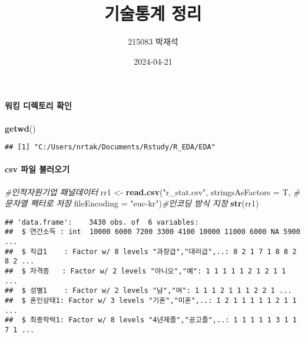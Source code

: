 \documentclass[
]{article}
\title{기술통계 정리}
\author{215083 박재석}
\date{2024-04-21}
\newenvironment{Shaded}{\begin{snugshade}}{\end{snugshade}}
\newcommand{\AttributeTok}[1]{\textcolor[rgb]{0.13,0.29,0.53}{#1}}
\newcommand{\CommentTok}[1]{\textcolor[rgb]{0.56,0.35,0.01}{\textit{#1}}}
\newcommand{\FunctionTok}[1]{\textcolor[rgb]{0.13,0.29,0.53}{\textbf{#1}}}
\newcommand{\NormalTok}[1]{#1}
\newcommand{\OtherTok}[1]{\textcolor[rgb]{0.56,0.35,0.01}{#1}}
\newcommand{\StringTok}[1]{\textcolor[rgb]{0.31,0.60,0.02}{#1}}
\begin{document}
\maketitle

\hypertarget{uxc6ccuxd0b9-uxb514uxb809uxd1a0uxb9ac-uxd655uxc778}{%
\paragraph{워킹 디렉토리
확인}\label{uxc6ccuxd0b9-uxb514uxb809uxd1a0uxb9ac-uxd655uxc778}}

\begin{Shaded}
\begin{Highlighting}[]
\FunctionTok{getwd}\NormalTok{()}
\end{Highlighting}
\end{Shaded}

\begin{verbatim}
## [1] "C:/Users/nrtak/Documents/Rstudy/R_EDA/EDA"
\end{verbatim}

\hypertarget{csv-uxd30cuxc77c-uxbd88uxb7ecuxc624uxae30}{%
\paragraph{csv 파일
불러오기}\label{csv-uxd30cuxc77c-uxbd88uxb7ecuxc624uxae30}}

\begin{Shaded}
\begin{Highlighting}[]
\CommentTok{\#인적자원기업 패널데이터}
\NormalTok{rr1 }\OtherTok{\textless{}{-}} \FunctionTok{read.csv}\NormalTok{(}\StringTok{"r\_stat.csv"}\NormalTok{,}
                \AttributeTok{stringsAsFactors =}\NormalTok{ T,   }\CommentTok{\#문자열 펙터로 저장}
                \AttributeTok{fileEncoding =} \StringTok{"euc{-}kr"}\NormalTok{)}\CommentTok{\#인코딩 방식 지정}
\FunctionTok{str}\NormalTok{(rr1)}
\end{Highlighting}
\end{Shaded}

\begin{verbatim}
## 'data.frame':    3430 obs. of  6 variables:
##  $ 연간소득 : int  10000 6000 7200 3300 4100 10000 11000 6000 NA 5900 ...
##  $ 직급1    : Factor w/ 8 levels "과장급","대리급",..: 8 2 1 7 1 8 8 2 8 2 ...
##  $ 자격증   : Factor w/ 2 levels "아니오","예": 1 1 1 1 1 2 1 2 1 1 ...
##  $ 성별1    : Factor w/ 2 levels "남","여": 1 1 1 2 1 1 1 2 2 1 ...
##  $ 혼인상태1: Factor w/ 3 levels "기혼","미혼",..: 1 2 1 1 1 1 1 2 1 1 ...
##  $ 최종학력1: Factor w/ 8 levels "4년제졸","공고졸",..: 1 1 1 1 1 3 1 1 7 1 ...
\end{verbatim}
\end{document}
